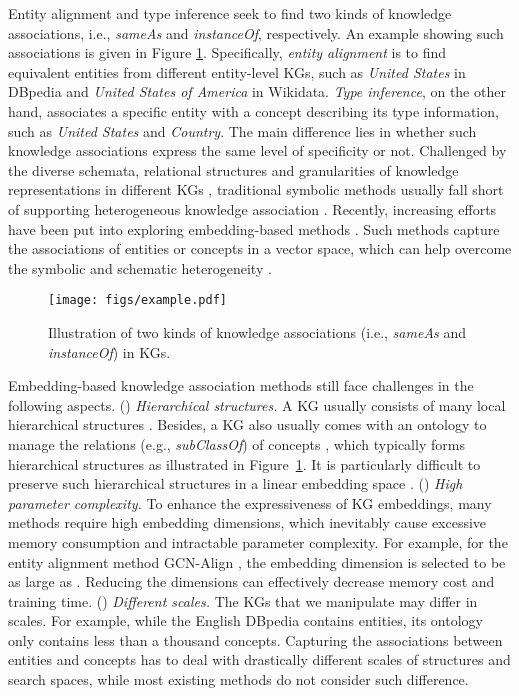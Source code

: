 \documentclass[11pt,a4paper]{article}
\begin{document}
Entity alignment and type inference seek to find two kinds of knowledge associations, i.e., \textit{sameAs} and \textit{instanceOf}, respectively. An example showing such associations is given in Figure \ref{fig:example}. Specifically, \emph{entity alignment} is to find equivalent entities from different entity-level KGs, such as \textit{United States} in DBpedia and \textit{United States of America} in Wikidata. \emph{Type inference}, on the other hand, associates a specific entity with a concept describing its type information, such as \textit{United States} and \textit{Country}. The main difference lies in whether such knowledge associations express the same level of specificity or not. Challenged by the diverse schemata, relational structures and granularities of knowledge representations in different KGs \cite{Schema_Heterogeneity}, traditional symbolic methods usually fall short of supporting heterogeneous knowledge association \cite{PARIS,SIGMa,Type_Inference}. Recently, increasing efforts have been put into exploring embedding-based methods \cite{MTransE,LinkNBed,Entity_Typing}. Such methods capture the associations of entities or concepts in a vector space, which can help overcome the symbolic and schematic heterogeneity \cite{JAPE}.
\begin{figure}[!t]
	\centering 
	\texttt{[image: figs/example.pdf]}
	\caption{Illustration of two kinds of knowledge associations (i.e., \textit{sameAs} and \textit{instanceOf}) in KGs.}\label{fig:example}
	\vspace{-1.2em}
\end{figure}

Embedding-based knowledge association methods still face challenges in the following aspects. () \textit{Hierarchical structures.} A KG usually consists of many local hierarchical structures \cite{EntityHierarchy15}. Besides, a KG also usually comes with an ontology to manage the relations (e.g., \textit{subClassOf}) of concepts \cite{JOIE}, which typically forms hierarchical structures as illustrated in Figure~\ref{fig:example}. It is particularly difficult to preserve such hierarchical structures in a linear embedding space \cite{nickel2014reducing}. () \textit{High parameter complexity.} To enhance the expressiveness of KG embeddings, many methods require high embedding dimensions, which inevitably cause excessive memory consumption and intractable parameter complexity. For example, for the entity alignment method GCN-Align \cite{GCN_Align}, the embedding dimension is selected to be as large as . Reducing the dimensions can effectively decrease memory cost and training time. () \textit{Different scales.} The KGs that we manipulate may differ in scales. For example, while the English DBpedia contains  entities, its ontology only contains less than a thousand concepts. Capturing the associations between entities and concepts has to deal with drastically different scales of structures and search spaces, while most existing methods do not consider such difference.
\end{document}

